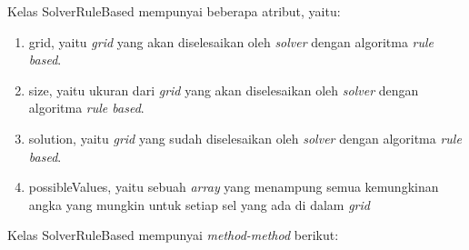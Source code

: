 Kelas SolverRuleBased mempunyai beberapa atribut, yaitu:

\begin{enumerate}
\item grid, yaitu \textit{grid} yang akan diselesaikan oleh \textit{solver} dengan algoritma \textit{rule based}.
\item size, yaitu ukuran dari \textit{grid} yang akan diselesaikan oleh \textit{solver} dengan algoritma \textit{rule based}.
\item solution, yaitu \textit{grid} yang sudah diselesaikan oleh \textit{solver} dengan algoritma \textit{rule based}.
\item possibleValues, yaitu sebuah \textit{array} yang menampung semua kemungkinan angka yang mungkin untuk setiap sel yang ada di dalam \textit{grid}
\end{enumerate}

Kelas SolverRuleBased mempunyai \textit{method-method} berikut:


